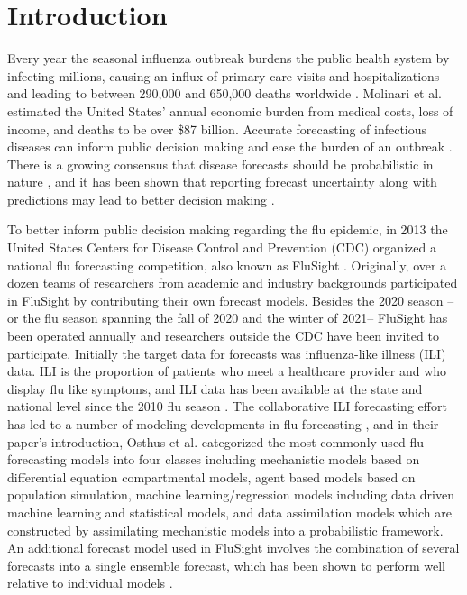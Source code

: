 \section{Introduction}

Every year the seasonal influenza outbreak burdens the public health system by 
infecting millions, causing an influx of primary care visits and 
hospitalizations and leading to between 290,000 and 650,000 deaths worldwide 
\cite[]{whoflufact2023}. Molinari et al. \cite[]{molinari2007annual} estimated 
the United States' annual economic burden from medical costs, loss of income, 
and deaths to be over \$87 billion. Accurate forecasting of infectious diseases 
can inform public decision making and ease the burden of an outbreak 
\cite[]{turtle2021accurate, lutz2019applying}.
There is a growing consensus that disease forecasts should be probabilistic in 
nature \cite[]{gneiting2014probabilistic, bracher2021evaluating}, and it has 
been shown that reporting forecast uncertainty along with predictions may lead 
to better decision making 
\cite[]{ramos2013probabilistic, joslyn2012uncertainty, winkler1971probabilistic}.


To better inform public decision making regarding the flu epidemic, in 2013 the 
United States Centers for Disease Control and Prevention (CDC) organized a 
national flu forecasting competition, also known as FluSight 
\cite[]{biggerstaff2016results, mathis2024evaluation,cdcfluforecasting2024}. 
Originally, over a dozen teams of researchers from academic and industry 
backgrounds participated in FluSight by contributing their own forecast models. 
Besides the 2020 season --or the flu season spanning the fall of 2020 and the 
winter of 2021-- FluSight has been operated annually and researchers outside 
the CDC have been invited to participate. Initially the target data for 
forecasts was influenza-like illness (ILI) data. ILI is the proportion of 
patients who meet a healthcare provider and who display flu like symptoms, 
and ILI data has been available at the state and national level since the 2010 
flu season \cite[]{cdcfluview2023,cdc2024fluviewportal}. 
The collaborative ILI forecasting effort has led to a number of modeling 
developments in flu forecasting 
\cite[see references therein for more examples]{mcandrew2021adaptively, 
osthus2021multiscale, osthus2019dynamic, ulloa2019}, and in their paper's 
introduction, Osthus et al.  \cite[]{osthus2019dynamic} categorized the most 
commonly used flu forecasting models into four classes including mechanistic 
models based on differential equation compartmental models, agent based models 
based on population simulation, machine learning/regression models including 
data driven machine learning and statistical models, and data assimilation 
models which are constructed by assimilating mechanistic models into a 
probabilistic framework. An additional forecast model used in FluSight 
involves the combination of several forecasts into a single ensemble forecast, 
which has been shown to perform well relative to individual models 
\cite[]{mcandrew2021adaptively, ray2020ensemble, yamana2016superensemble}.


